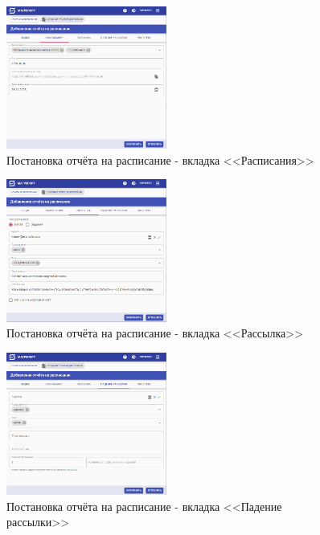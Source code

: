\documentclass[../user-manual.tex]{subfiles}
\begin{document}
	\begin{figure}[h]
		\centering
		\includegraphics[width=0.47\textwidth]{img/31-schedule-report-create-2.png}
		\caption{Постановка отчёта на расписание - вкладка <<Расписания>>}
		\label{fig:schedule-report-create-2}
	\end{figure}

	\begin{figure}[h]
		\centering
		\includegraphics[width=0.47\textwidth]{img/32-schedule-report-create-3.png}
		\caption{Постановка отчёта на расписание - вкладка <<Рассылка>>}
		\label{fig:schedule-report-create-3}
	\end{figure}

	\begin{figure}[h]
		\centering
		\includegraphics[width=0.47\textwidth]{img/33-schedule-report-create-4.png}
		\caption{Постановка отчёта на расписание - вкладка <<Падение рассылки>>}
		\label{fig:schedule-report-create-4}
	\end{figure}
\end{document}
